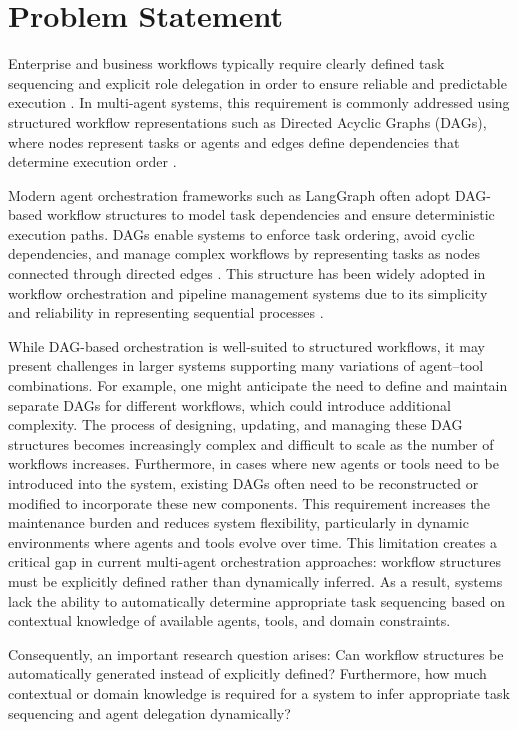\section{Problem Statement}
\noindent Enterprise and business workflows typically require clearly defined task sequencing and explicit role delegation in order to ensure reliable and predictable execution \citet{elementum2026deterministicprobabilistic}. In multi-agent systems, this requirement is commonly addressed using structured workflow representations such as Directed Acyclic Graphs (DAGs), where nodes represent tasks or agents and edges define dependencies that determine execution order \citet{nath2025dagagents}.

\noindent Modern agent orchestration frameworks such as LangGraph often adopt DAG-based workflow structures to model task dependencies and ensure deterministic execution paths. DAGs enable systems to enforce task ordering, avoid cyclic dependencies, and manage complex workflows by representing tasks as nodes connected through directed edges \citet{langchain2024langgraphapi}. This structure has been widely adopted in workflow orchestration and pipeline management systems due to its simplicity and reliability in representing sequential processes \citep{shankar2025langgraph_dag}.

\noindent While DAG-based orchestration is well-suited to structured workflows, it may present challenges in larger systems supporting many variations of agent–tool combinations. For example, one might anticipate the need to define and maintain separate DAGs for different workflows, which could introduce additional complexity.
The process of designing, updating, and managing these DAG structures becomes increasingly complex and difficult to scale as the number of workflows increases.
\noindent Furthermore, in cases where new agents or tools need to be introduced into the system, existing DAGs often need to be reconstructed or modified to incorporate these new components. This requirement increases the maintenance burden and reduces system flexibility, particularly in dynamic environments where agents and tools evolve over time.
This limitation creates a critical gap in current multi-agent orchestration approaches: workflow structures must be explicitly defined rather than dynamically inferred. As a result, systems lack the ability to automatically determine appropriate task sequencing based on contextual knowledge of available agents, tools, and domain constraints.

\noindent Consequently, an important research question arises: Can workflow structures be automatically generated instead of explicitly defined? Furthermore, how much contextual or domain knowledge is required for a system to infer appropriate task sequencing and agent delegation dynamically?

